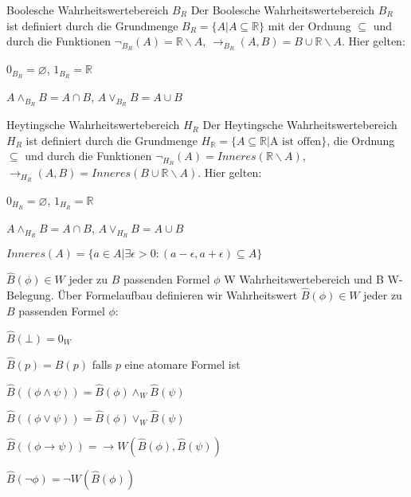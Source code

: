 \documentclass[avery5371]{flashcards}
\begin{document}
\begin{flashcard}[ Wahrheitswertebereiche ]{ Boolesche Wahrheitswertebereich $B_R$ }
    Der Boolesche Wahrheitswertebereich $B_R$ ist definiert durch die Grundmenge $B_R=\{A|A\subseteq \mathbb{R}\}$ mit der Ordnung $\subseteq$ und durch die Funktionen $\lnot_{B_R} (A) =\mathbb{R}\backslash A$, $\rightarrow_{B_R} (A,B) = B\cup\mathbb{R}\backslash A$. Hier gelten:
    \begin{itemize*}
        \item $0_{B_R}=\varnothing$, $1_{B_R}=\mathbb{R}$
        \item $A\wedge_{B_R} B=A\cap B$, $A\vee_{B_R} B=A\cup B$
    \end{itemize*}
\end{flashcard}

\begin{flashcard}[ Wahrheitswertebereiche ]{ Heytingsche Wahrheitswertebereich $H_R$ }
    Der Heytingsche Wahrheitswertebereich $H_R$ ist definiert durch die Grundmenge $H_{\mathbb{R}} =\{A\subseteq\mathbb{R} | \text{A ist offen}\}$, die Ordnung $\subseteq$ und durch die Funktionen $\lnot_{H_R} (A) = Inneres(\mathbb{R}\backslash A)$, $\rightarrow_{H_R} (A,B) =Inneres(B\cup \mathbb{R}\backslash A)$. Hier gelten:
    \begin{itemize*}
        \item $0_{H_R}=\varnothing$, $1_{H_R}=\mathbb{R}$
        \item $A\wedge_{H_R} B= A\cap B$, $A\vee_{H_R} B=A\cup B$
        \item $Inneres(A) =\{a\in A|\exists \epsilon >0 : (a-\epsilon,a+\epsilon)\subseteq A\}$
    \end{itemize*}
\end{flashcard}

\begin{flashcard}[ Wahrheitswertebereiche ]{ $\hat{B}(\phi)\in W$ jeder zu $B$ passenden Formel $\phi$}
    W Wahrheitswertebereich und B W-Belegung. Über Formelaufbau definieren wir Wahrheitswert $\hat{B}(\phi)\in W$ jeder zu $B$ passenden Formel $\phi$:
    \begin{itemize*}
        \item $\hat{B}(\bot) = 0_W$
        \item $\hat{B}(p) = B(p)$ falls $p$ eine atomare Formel ist
        \item $\hat{B}((\phi\wedge \psi )) = \hat{B}(\phi)\wedge_W \hat{B}(\psi )$
        \item $\hat{B}((\phi\vee \psi )) = \hat{B}(\phi)\vee_W \hat{B}(\psi )$
        \item $\hat{B}((\phi\rightarrow \psi )) = \rightarrow W(\hat{B}(\phi),\hat{B}(\psi ))$
        \item $\hat{B}(\lnot\phi) = \lnot W(\hat{B}(\phi))$
    \end{itemize*}
\end{flashcard}
\end{document}
